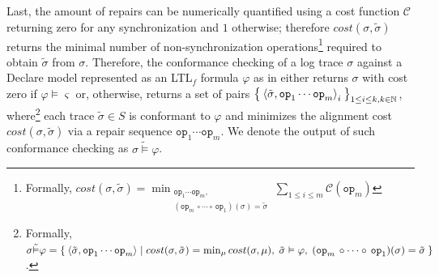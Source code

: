 Last, the amount of repairs can be numerically quantified using a cost function $\mathcal{C}$ returning zero for any synchronization and $1$ otherwise; therefore $cost(\sigma, \tilde{\sigma})$ returns the minimal number of non-synchronization operations\footnote{Formally, $cost(\sigma,\tilde{\sigma})=\min_{\substack{\texttt{op}_1\cdots \texttt{op}_m,\\(\texttt{op}_m\,\circ \cdots\circ\, \texttt{op}_1)(\sigma)=\tilde{\sigma}}}\sum_{1\leq i\leq m}\mathcal{C}(\texttt{op}_m)$} required to obtain $\tilde{\sigma}$ from $\sigma$. Therefore, the conformance checking of a log trace $\sigma$ against a  Declare model represented as an LTL$_f$ formula $\varphi$ as in \cite{XuLZ17a} either returns $\sigma$ with cost zero if $\varphi\vDash\varsigma$ or, otherwise, returns a set of pairs $\Set{\braket{\tilde{\sigma},\texttt{op}_1\cdots\texttt{op}_m}_i}_{1\leq i\leq k, k\in\mathbb{N}}$, where\footnote{Formally, $\sigma\tilde{\vDash}\varphi = \Set{\braket{\tilde{\sigma},\texttt{op}_1\cdots\texttt{op}_m} | cost(\sigma,\tilde{\sigma}) = \min_\mu cost(\sigma,\mu),\;\tilde{\sigma}\vDash\varphi,\; (\texttt{op}_m\,\circ \cdots\circ\, \texttt{op}_1)(\sigma)=\tilde{\sigma}}$.} each trace $\tilde{\sigma}\in S$ is conformant to $\varphi$ and minimizes the alignment cost $cost(\sigma,\tilde{\sigma})$ via a repair sequence $\texttt{op}_1\cdots\texttt{op}_m$. We denote the output of such conformance checking as $\sigma\tilde{\vDash}\varphi$. 



